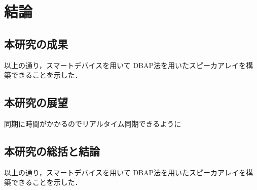 \chapter{結論}
\section{本研究の成果}

以上の通り，スマートデバイスを用いて
DBAP法を用いたスピーカアレイを構築できることを示した．


\section{本研究の展望}

同期に時間がかかるのでリアルタイム同期できるように

\section{本研究の総括と結論}

以上の通り，スマートデバイスを用いて
DBAP法を用いたスピーカアレイを構築できることを示した．
